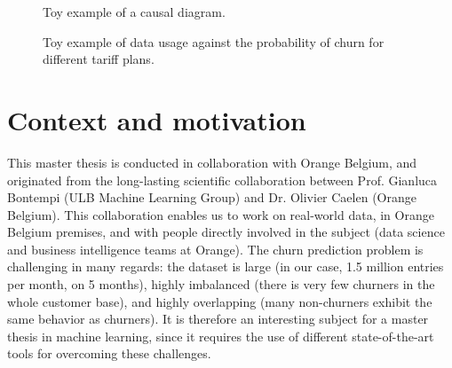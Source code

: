 \begin{figure}
    \centering
    \caption{Toy example of a causal diagram.}
    \label{simple_causal}
\end{figure}

\begin{figure}
    \centering
    
    \caption{Toy example of data usage against the probability of churn for
    different tariff plans.}
    \label{simple_causal_plot}
\end{figure}

\section{Context and motivation}

This master thesis is conducted in collaboration with Orange Belgium, and
originated from the long-lasting scientific collaboration between Prof. Gianluca
Bontempi (ULB Machine Learning Group) and Dr. Olivier Caelen (Orange Belgium).
This collaboration enables us to work on real-world data, in Orange Belgium
premises, and with people directly involved in the subject (data science and
business intelligence teams at Orange). The churn prediction problem is
challenging in many regards: the dataset is large (in our case, 1.5 million
entries per month, on 5 months), highly imbalanced (there is very few churners
in the whole customer base), and highly overlapping (many non-churners exhibit
the same behavior as churners). It is therefore an interesting subject for a
master thesis in machine learning, since it requires the use of different
state-of-the-art tools for overcoming these challenges.

